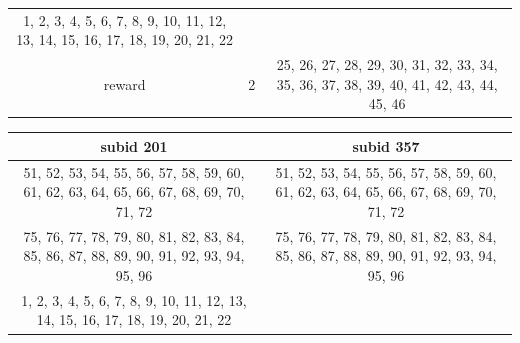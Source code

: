 \documentclass[]{article}
\begin{document}
\begin{longtable}[]{@{}ccc@{}}
\begin{minipage}[t]{0.41\columnwidth}
1, 2, 3, 4, 5, 6, 7, 8, 9, 10, 11, 12, 13, 14, 15, 16, 17, 18, 19, 20,
21, 22\strut
\end{minipage}\tabularnewline
\begin{minipage}[t]{0.16\columnwidth}\centering\strut
reward\strut
\end{minipage} & \begin{minipage}[t]{0.10\columnwidth}\centering\strut
2\strut
\end{minipage} & \begin{minipage}[t]{0.41\columnwidth}\centering\strut
25, 26, 27, 28, 29, 30, 31, 32, 33, 34, 35, 36, 37, 38, 39, 40, 41, 42,
43, 44, 45, 46\strut
\end{minipage}\tabularnewline
\bottomrule
\end{longtable}

\begin{longtable}[]{@{}cc@{}}
\toprule
\begin{minipage}[b]{0.43\columnwidth}\centering\strut
subid 201\strut
\end{minipage} & \begin{minipage}[b]{0.43\columnwidth}\centering\strut
subid 357\strut
\end{minipage}\tabularnewline
\midrule
\endhead
\begin{minipage}[t]{0.43\columnwidth}\centering\strut
51, 52, 53, 54, 55, 56, 57, 58, 59, 60, 61, 62, 63, 64, 65, 66, 67, 68,
69, 70, 71, 72\strut
\end{minipage} & \begin{minipage}[t]{0.43\columnwidth}\centering\strut
51, 52, 53, 54, 55, 56, 57, 58, 59, 60, 61, 62, 63, 64, 65, 66, 67, 68,
69, 70, 71, 72\strut
\end{minipage}\tabularnewline
\begin{minipage}[t]{0.43\columnwidth}\centering\strut
75, 76, 77, 78, 79, 80, 81, 82, 83, 84, 85, 86, 87, 88, 89, 90, 91, 92,
93, 94, 95, 96\strut
\end{minipage} & \begin{minipage}[t]{0.43\columnwidth}\centering\strut
75, 76, 77, 78, 79, 80, 81, 82, 83, 84, 85, 86, 87, 88, 89, 90, 91, 92,
93, 94, 95, 96\strut
\end{minipage}\tabularnewline
\begin{minipage}[t]{0.43\columnwidth}\centering\strut
1, 2, 3, 4, 5, 6, 7, 8, 9, 10, 11, 12, 13, 14, 15, 16, 17, 18, 19, 20,
21, 22\strut
\end{minipage} & \begin{minipage}[t]{0.43\columnwidth}\centering\strut

\end{minipage}
\end{longtable}
\end{document}
